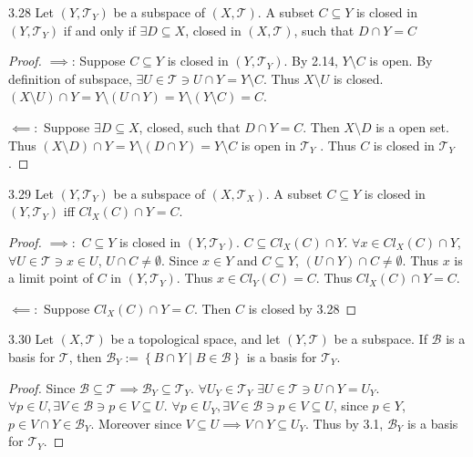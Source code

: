 \documentclass{article}
\newcommand*{\T}{\mathcal{T}}
\newcommand*{\B}{\mathcal{B}}
\begin{document}
\bigskip

\begin{claim}{3.28}\label{Claim 3.28.}
    Let $(Y, \T_Y)$ be a subspace of $(X, \T)$. A subset $C \subseteq Y$ is closed in $(Y, \T_Y)$ if and only if $\exists D \subseteq X$, closed in $(X, \T)$, such that $D \cap Y = C$        
\end{claim}
\begin{proof}
    $\implies$: Suppose $C \subseteq Y$ is closed in $(Y, \T_Y)$. By 2.14, $Y \setminus C$ is open. By definition of subspace, $\exists U \in \T \ni U \cap Y = Y \setminus C$. Thus $X \setminus U$ is closed. $(X \setminus U) \cap Y = Y \setminus (U \cap Y) = Y \setminus (Y \setminus C) = C$. 
    
    $\impliedby:$ Suppose $\exists D \subseteq X$, closed, such that $D \cap Y = C$. Then $X \setminus D$ is a open set. Thus $(X \setminus D) \cap Y = Y \setminus (D \cap Y) = Y \setminus C$ is open in $\T_Y$ . Thus $C$ is closed in $\T_Y$.        
\end{proof}

\bigskip

\begin{claim}{3.29}\label{Claim 3.29.}
    Let $(Y, \T_Y)$ be a subspace of $(X, \T_X)$. A subset $C \subseteq Y$ is closed in $(Y, \T_Y)$ iff $Cl_X(C) \cap Y = C$.     
\end{claim}
\begin{proof}
    $\implies:$ $C \subseteq Y$ is closed in $(Y, \T_Y)$. $C \subseteq Cl_X(C) \cap Y$. $\forall x \in Cl_X(C) \cap Y$, $\forall U \in \T \ni x \in U$, $U \cap C \neq \emptyset$. Since $x \in Y$ and $C \subseteq Y$, $(U \cap Y) \cap C \neq \emptyset$. Thus $x$ is a limit point of $C$ in $(Y, \T_Y)$. Thus $x \in Cl_Y(C)= C$. Thus $Cl_X(C) \cap Y = C$. 
    
    $\impliedby:$ Suppose $Cl_X(C) \cap Y = C$. Then $C$ is closed by 3.28   
\end{proof}

\bigskip

\begin{claim}{3.30}\label{Claim 3.30.}
    Let $(X, \T)$ be a topological space, and let $(Y, \T)$ be a subspace. If $\B$ is a basis for $\T$, then $\B_{Y} := \left\{ B \cap Y \mid B \in \B \right\}$ is a basis for $\T_Y$.       
\end{claim}
\begin{proof}
    Since $\B \subseteq \T \implies \B_Y \subseteq \T_Y$. $\forall U_Y \in \T_Y$ $\exists U \in \T \ni U \cap Y = U_Y$. $\forall p \in U, \exists V \in \B \ni p \in V \subseteq U$. $\forall p \in U_Y, \exists V \in \B \ni p \in V \subseteq U$, since $p \in Y$, $p \in V \cap Y \in \B_Y$. Moreover since $V \subseteq U \implies V \cap Y \subseteq U_Y$. Thus by 3.1, $\B_Y$ is a basis for $\T_Y$.            
\end{proof}
\end{document}
